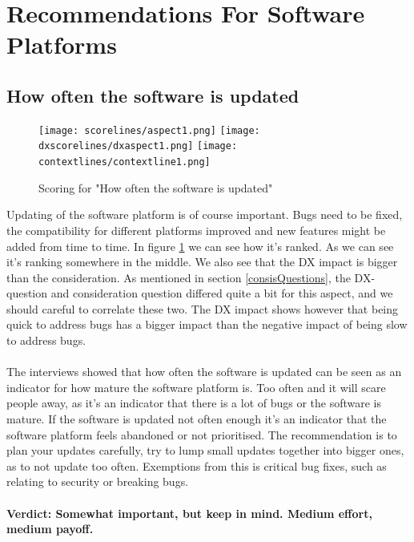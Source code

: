 \documentclass{cslthse-msc}
\begin{document}
    \section{Recommendations For Software Platforms}\label{sec:recommendations}
    \subsection{How often the software is updated}
    \begin{figure}[H]
        \centering
        \texttt{[image: scorelines/aspect1.png]}
        \texttt{[image: dxscorelines/dxaspect1.png]}
        \texttt{[image: contextlines/contextline1.png]}
        \caption{Scoring for "How often the software is updated"}
        \label{fig:aspect1}
    \end{figure}
    Updating of the software platform is of course important. Bugs need to be fixed, the compatibility for different platforms improved and new features might be added from time to time. In figure \ref{fig:aspect1} we can see how it's ranked. As we can see it's ranking somewhere in the middle. We also see that the DX impact is bigger than the consideration. As mentioned in section \ref{consisQuestions}, the DX-question and consideration question differed quite a bit for this aspect, and we should careful to correlate these two. The DX impact shows however that being quick to address bugs has a bigger impact than the negative impact of being slow to address bugs.\\ \\The interviews showed that how often the software is updated can be seen as an indicator for how mature the software platform is. Too often and it will scare people away, as it's an indicator that there is a lot of bugs or the software is mature. If the software is updated not often enough it's an indicator that the software platform feels abandoned or not prioritised. The recommendation is to plan your updates carefully, try to lump small updates together into bigger ones, as to not update too often. Exemptions from this is critical bug fixes, such as relating to security or breaking bugs.\\ \\
    \textbf{Verdict: Somewhat important, but keep in mind. Medium effort, medium payoff.}
\end{document}
